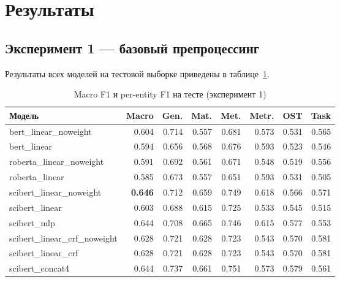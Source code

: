 \section{Результаты}

\subsection{Эксперимент 1 --- базовый препроцессинг}

Результаты всех моделей на тестовой выборке приведены в таблице~\ref{tab:results_v1}.

\begin{table}[h]
\centering
\caption{Macro F1 и per-entity F1 на тесте (эксперимент 1)}
\label{tab:results_v1}
\small
\begin{tabular}{lrrrrrrr}
\toprule
\textbf{Модель} & \textbf{Macro} & \textbf{Gen.} & \textbf{Mat.} & \textbf{Met.} & \textbf{Metr.} & \textbf{OST} & \textbf{Task} \\
\midrule
bert\_linear\_noweight        & 0.604 & 0.714 & 0.557 & 0.681 & 0.573 & 0.531 & 0.565 \\
bert\_linear                  & 0.594 & 0.656 & 0.568 & 0.676 & 0.593 & 0.523 & 0.546 \\
roberta\_linear\_noweight     & 0.591 & 0.692 & 0.561 & 0.671 & 0.548 & 0.519 & 0.556 \\
roberta\_linear               & 0.585 & 0.673 & 0.557 & 0.651 & 0.593 & 0.531 & 0.505 \\
scibert\_linear\_noweight     & \textbf{0.646} & 0.712 & 0.659 & 0.749 & 0.618 & 0.566 & 0.571 \\
scibert\_linear               & 0.603 & 0.688 & 0.615 & 0.725 & 0.533 & 0.545 & 0.515 \\
scibert\_mlp                  & 0.644 & 0.708 & 0.665 & 0.746 & 0.615 & 0.577 & 0.553 \\
scibert\_linear\_crf\_noweight& 0.628 & 0.721 & 0.628 & 0.723 & 0.543 & 0.570 & 0.581 \\
scibert\_linear\_crf          & 0.628 & 0.721 & 0.628 & 0.723 & 0.543 & 0.570 & 0.581 \\
scibert\_concat4              & 0.644 & 0.737 & 0.661 & 0.751 & 0.573 & 0.579 & 0.561 \\
\bottomrule
\end{tabular}
\end{table}


